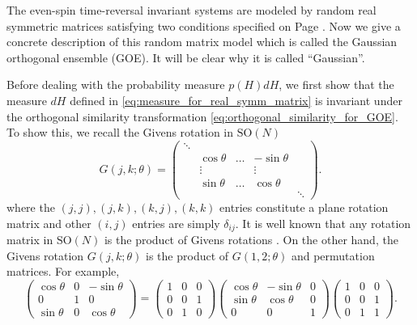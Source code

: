 \documentclass[11pt, a4paper]{article}
\numberwithin{equation}{section}
\newcommand{\SOrthogonal}{\mathrm{SO}}
\theoremstyle{definition}
\theoremstyle{remark}
\begin{document}
The even-spin time-reversal invariant systems are modeled by random real symmetric matrices satisfying two conditions specified on Page \pageref{enu:first_condition_of_GOE}. Now we give a concrete description of this random matrix model which is called the Gaussian orthogonal ensemble (GOE). It will be clear why it is called ``Gaussian''.

Before dealing with the probability measure $p(H) dH$, we first show that the measure $dH$ defined in \eqref{eq:measure_for_real_symm_matrix} is invariant under the orthogonal similarity transformation \eqref{eq:orthogonal_similarity_for_GOE}. To show this, we recall the Givens rotation in $\SOrthogonal(N)$
\begin{equation}
  G(j, k; \theta) =
  \begin{pmatrix}
    \ddots & & & & \\
     & \cos \theta & \dots & -\sin \theta & \\
     & \vdots & & \vdots & \\
     & \sin \theta & \dots & \cos \theta \\
     & & & & \ddots
  \end{pmatrix}.
\end{equation}
where the $(j, j), (j, k), (k, j), (k, k)$ entries constitute a plane rotation matrix and other $(i,j)$ entries are simply $\delta_{ij}$. It is well known that any rotation matrix in $\SOrthogonal(N)$ is the product of Givens rotations \cite[Section 5.2.3]{Golub-Van_Loan96}. On the other hand, the Givens rotation $G(j, k; \theta)$ is the product of $G(1, 2; \theta)$ and permutation matrices. For example,
\begin{equation}
  \begin{pmatrix}
    \cos \theta & 0 & -\sin \theta \\
    0 & 1 & 0 \\
    \sin \theta & 0 & \cos \theta
  \end{pmatrix}
  =
  \begin{pmatrix}
    1 & 0 & 0 \\
    0 & 0 & 1 \\
    0 & 1 & 0
  \end{pmatrix}
  \begin{pmatrix}
    \cos \theta & -\sin \theta & 0 \\
    \sin \theta & \cos \theta & 0 \\
    0 & 0 & 1
  \end{pmatrix}
  \begin{pmatrix}
    1 & 0 & 0 \\
    0 & 0 & 1 \\
    0 & 1 & 1
  \end{pmatrix}.
\end{equation}
\end{document}
